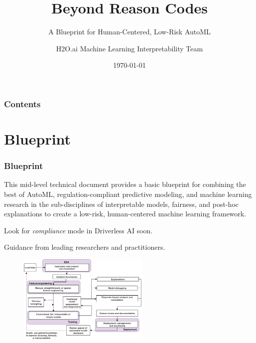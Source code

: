 \documentclass[11pt,
               aspectratio=169,
               hyperref={colorlinks}
               ]{beamer}
\author{H2O.ai Machine Learning Interpretability Team}
\title{Beyond Reason Codes}
\subtitle{A Blueprint for Human-Centered, Low-Risk AutoML}
\institute{\href{https://www.h2o.ai}{H\textsubscript{2}O.ai}}
\date{\today}
\begin{document}
	
	\maketitle
	
	\begin{frame}
	
		\frametitle{Contents}
		
		\tableofcontents{}
		
	\end{frame}

	\section{Blueprint}
	
		\begin{frame}[allowframebreaks]
		
			\frametitle{Blueprint}			
			
			This mid-level technical document provides a basic blueprint for combining the best of AutoML, regulation-compliant predictive modeling, and machine learning research in the sub-disciplines of interpretable models, fairness, and post-hoc explanations to create a low-risk, human-centered machine learning framework.\\
			
			\vspace{10pt}			
			
			Look for \textit{compliance} mode in Driverless AI soon.
			
			\vspace{10pt}			
			
			Guidance from leading researchers and practitioners.
							
			\framebreak								
							
			\begin{figure}[htb]
				\begin{center}
					\includegraphics[height=120pt]{img/blueprint.png}
					\label{fig:blueprint}
				\end{center}
			\end{figure}		
		
		\end{frame}
\end{document}
